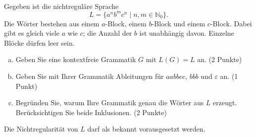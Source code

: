 


\\
Gegeben ist die nichtreguläre Sprache
\[
L=\{a^n b^m c^n\mid n,m\in\mathbb{N}_0\}.
\]
Die Wörter bestehen aus einem $a$-Block, einem $b$-Block und einem $c$-Block.
Dabei gibt es gleich viele $a$ wie $c$; die Anzahl der $b$ ist unabhängig davon.
Einzelne Blöcke dürfen leer sein.
\begin{enumerate}[a)]
\item Geben Sie eine kontextfreie Grammatik $G$ mit $L(G)=L$ an. (2 Punkte)
\item Geben Sie mit Ihrer Grammatik Ableitungen für $aabbcc$, $bbb$ und
$\varepsilon$ an. (1 Punkt)
\item Begründen Sie, warum Ihre Grammatik genau die Wörter aus $L$ erzeugt.
Berücksichtigen Sie beide Inklusionen. (2 Punkte)
\end{enumerate}
Die Nichtregularität von $L$ darf als bekannt vorausgesetzt werden.

